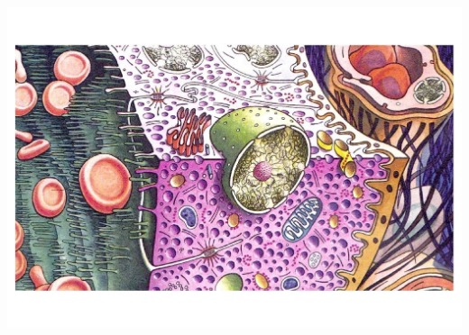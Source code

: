 \begin{titlepage}
	\includegraphics[width=15cm]{../frontespizio/figure.pdf}
	
	\vspace{2cm}
	
	\vfill %
	
%	
%	
%	
%	

\end{titlepage}

\clearpage{\pagestyle{empty}\cleardoublepage}
